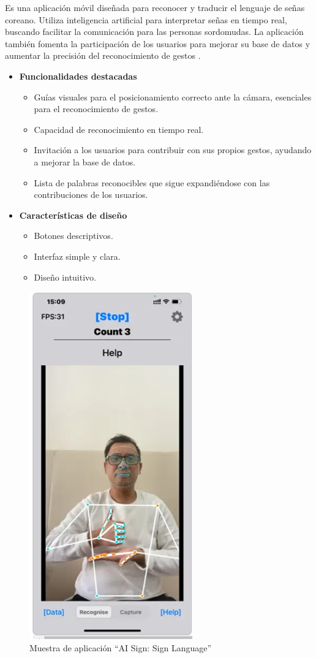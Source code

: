 Es una aplicación móvil diseñada para reconocer y traducir el lenguaje de señas coreano. Utiliza inteligencia artificial para interpretar señas en tiempo real, buscando facilitar la comunicación para las personas sordomudas. La aplicación también fomenta la participación de los usuarios para mejorar su base de datos y aumentar la precisión del reconocimiento de gestos \cite{SignLanguageTranslatorAI}.

\begin{itemize}
    \item \textbf{Funcionalidades destacadas}
    \begin{itemize}
        \item Guías visuales para el posicionamiento correcto ante la cámara, esenciales para el reconocimiento de gestos.
        \item Capacidad de reconocimiento en tiempo real.
        \item Invitación a los usuarios para contribuir con sus propios gestos, ayudando a mejorar la base de datos.
        \item Lista de palabras reconocibles que sigue expandiéndose con las contribuciones de los usuarios.
    \end{itemize}

    \item \textbf{Características de diseño}
    \begin{itemize}
        \item Botones descriptivos.
        \item Interfaz simple y clara.
        \item Diseño intuitivo.
    \end{itemize}
\end{itemize}

\begin{figure} [H]
    \centering
    \includegraphics[width=0.25\linewidth]{figuras/ai_sign.png}
    \caption{Muestra de aplicación “AI Sign: Sign Language”}
    \label{fig:enter-label}
\end{figure}

